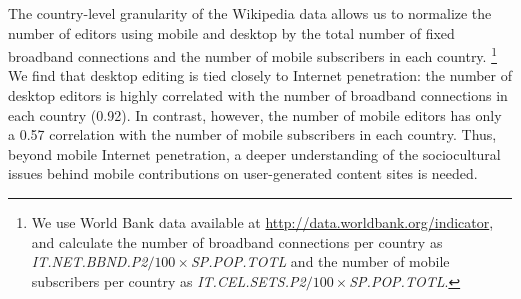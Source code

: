 \documentclass{sigchi}
\begin{document}

The country-level granularity of the Wikipedia data allows us to normalize the number of editors using mobile and desktop by the total number of fixed broadband connections and the number of mobile subscribers in each country.%
\footnote{We use World Bank data available at \url{http://data.worldbank.org/indicator}, and calculate the number of broadband connections per country as \emph{IT.\allowbreak{}NET.\allowbreak{}BBND.P2}$/100\times$\emph{SP.\allowbreak{}POP.\allowbreak{}TOTL} and the number of mobile subscribers per country as \emph{IT.\allowbreak{}CEL.\allowbreak{}SETS.P2}$/100\times$\emph{SP.\allowbreak{}POP.\allowbreak{}TOTL}.}
We find that desktop editing is tied closely to Internet penetration: the number of desktop editors is highly correlated with the number of broadband connections in each country (0.92). In contrast, however, the number of mobile editors has only a 0.57 correlation with the number of mobile subscribers in each country. Thus, beyond mobile Internet penetration, a deeper understanding of the sociocultural issues behind mobile contributions on user-generated content sites is needed.




\end{document}
